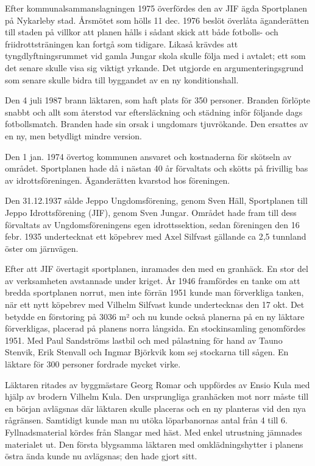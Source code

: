 


Efter kommunalsammanslagningen 1975 överfördes den av JIF ägda Sportplanen på Nykarleby stad. Årsmötet som hölls 11 dec. 1976 beslöt överlåta äganderätten till staden på villkor att planen hålls i sådant skick  att både fotbolls- och friidrottsträningen kan fortgå som tidigare. Likaså krävdes att tyngdlyftningsrummet vid gamla Jungar skola skulle följa med i avtalet; ett som det senare skulle visa sig viktigt yrkande. Det utgjorde en argumenteringsgrund som senare skulle bidra till byggandet av en ny konditionshall.

Den 4 juli 1987 brann läktaren, som  haft plats för 350 personer. Branden förlöpte snabbt och allt som återstod var eftersläckning och städning inför följande dags fotbollsmatch. Branden hade sin orsak i ungdomars tjuvrökande. Den ersattes av en ny, men betydligt mindre version.


Den 1 jan. 1974 övertog kommunen ansvaret och kostnaderna för skötseln av området. Sportplanen hade då i nästan 40 år förvaltats och skötts på frivillig bas av idrottsföreningen. Äganderätten kvarstod hos föreningen.\jhvspace{}


Den 31.12.1937 sålde Jeppo Ungdomsförening, genom Sven Häll, Sportplanen till Jeppo Idrottsförening (JIF), genom Sven Jungar. Området hade fram till dess förvaltats av Ungdomsföreningens egen idrottssektion, sedan föreningen den 16 febr. 1935 undertecknat ett köpebrev med Axel Silfvast gällande ca 2,5 tunnland öster om järnvägen.

Efter att JIF övertagit sportplanen, inramades den med en granhäck. En stor del av verksamheten avstannade under kriget. År 1946 framfördes  en tanke om att bredda sportplanen norrut, men inte förrän 1951 kunde man förverkliga tanken, när ett nytt köpebrev med Vilhelm Silfvast kunde undertecknas den 17 okt. Det betydde en förstoring på 3036 m² och nu kunde också planerna på en ny läktare förverkligas, placerad på planens norra långsida. En stockinsamling genomfördes 1951. Med Paul Sandströms lastbil och med pålastning för hand av Tauno Stenvik, Erik Stenvall och Ingmar Björkvik kom sej stockarna till sågen. En läktare för 300 personer fordrade mycket virke.

Läktaren ritades av byggmästare Georg Romar och uppfördes av Ensio Kula med hjälp av brodern Vilhelm Kula. Den ursprungliga granhäcken mot norr måste till en början avlägsnas där läktaren skulle placeras och en ny planteras vid den nya rågränsen. Samtidigt kunde man nu utöka löparbanornas antal från 4 till 6. Fyllnadsmaterial kördes från Slangar med häst. Med enkel utrustning jämnades materialet ut. Den första blygsamma läktaren med omklädningshytter i planens östra ända kunde nu avlägsnas; den hade gjort sitt.

